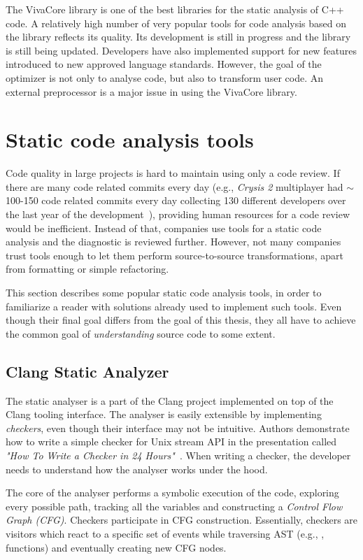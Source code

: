 The VivaCore library is one of the best libraries for the static analysis of C++ code. A relatively high number of very popular tools for code analysis based on the library reflects its quality. Its development is still in progress and the library is still being updated. Developers have also implemented support for new features introduced to new approved language standards. However, the goal of the optimizer is not only to analyse code, but also to transform user code. An external preprocessor is a major issue in using the VivaCore library.

\section{Static code analysis tools}
Code quality in large projects is hard to maintain using only a code review. If there are many code related commits every day (e.g., \emph{Crysis 2} multiplayer had $\sim$100-150 code related commits every day collecting 130 different developers over the last year of the development~\cite{crysis}), providing human resources for a code review would be inefficient. Instead of that, companies use tools for a static code analysis and the diagnostic is reviewed further. However, not many companies trust tools enough to let them perform source-to-source transformations, apart from formatting or simple refactoring.

This section describes some popular static code analysis tools, in order to familiarize a reader with solutions already used to implement such tools. Even though their final goal differs from the goal of this thesis, they all have to achieve the common goal of \textit{understanding} source code to some extent.

\subsection{Clang Static Analyzer}
\label{clang-analyzer}
The static analyser is a part of the Clang project implemented on top of the Clang tooling interface. The analyser is easily extensible by implementing \emph{checkers}, even though their interface may not be intuitive. Authors demonstrate how to write a simple checker for Unix stream API in the presentation called \textit{"How To Write a Checker in 24 Hours"}~\cite{clang-analyzer-presentation}. When writing a checker, the developer needs to understand how the analyser works under the hood.

The core of the analyser performs a symbolic execution of the code, exploring every possible path, tracking all the variables and constructing a \emph{Control Flow Graph (CFG)}. Checkers participate in CFG construction. Essentially, checkers are visitors which react to a specific set of events while traversing AST (e.g., ,  functions) and eventually creating new CFG nodes.

